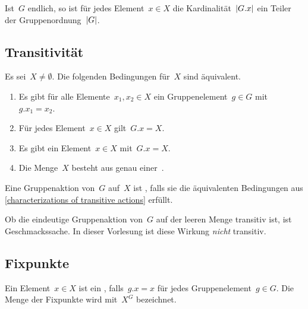 \begin{corollary}
  Ist~$G$ endlich, so ist für jedes Element~$x \in X$ die Kardinalität~$\lvert G.x\rvert$ ein Teiler der Gruppenordnung~$\lvert G\rvert$.
\end{corollary}




\subsection{Transitivität}

\begin{proposition}
  \label{characterizations of transitive actions}
  Es sei~$X \neq \emptyset$.
  Die folgenden Bedingungen für~$X$ sind äquivalent.
  \begin{enumerate}
    \item
      Es gibt für alle Elemente~$x_1, x_2 \in X$ ein Gruppenelement~$g \in G$ mit~$g.x_1 = x_2$.
    \item
      Für jedes Element~$x \in X$ gilt~$G.x = X$.
    \item
      Es gibt ein Element~$x \in X$ mit~$G.x = X$.
    \item
      Die Menge~$X$ besteht aus genau einer~.
  \end{enumerate}
\end{proposition}

\begin{definition}
  Eine Gruppenaktion von~$G$ auf~$X$ ist , falls sie die äquivalenten Bedingungen aus \cref{characterizations of transitive actions} erfüllt.
\end{definition}

\begin{warning}
  Ob die eindeutige Gruppenaktion von~$G$ auf der leeren Menge transitiv ist, ist Geschmackssache.
  In dieser Vorlesung ist diese Wirkung \emph{nicht} transitiv.
\end{warning}



\subsection{Fixpunkte}

\begin{definition}
  Ein Element~$x \in X$ ist ein , falls~$g.x = x$ für jedes Gruppenelement~$g \in G$.
  Die Menge der Fixpunkte wird mit~$X^G$ bezeichnet.
\end{definition}

